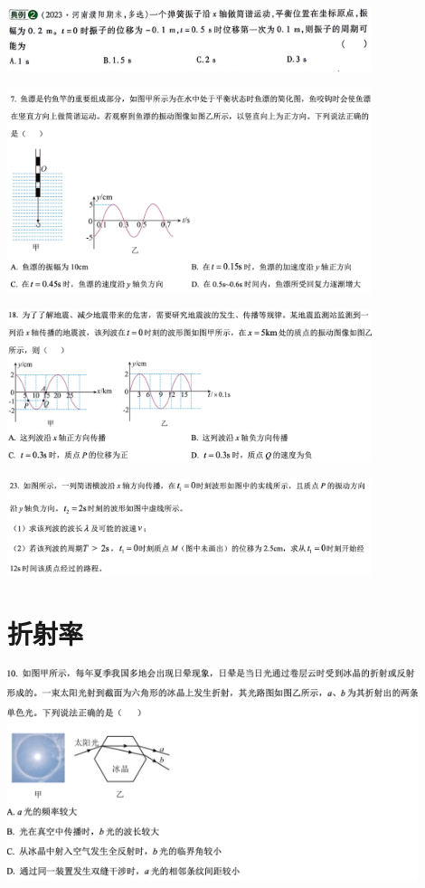 \documentclass{article}
\begin{document}
\includegraphics[width = 0.8\textwidth]{./pictures/17.png}

\vspace{5em}

\includegraphics[width = 0.8\textwidth]{./pictures/18.png}

\vspace{5em}

\includegraphics[width = 0.8\textwidth]{./pictures/19.png}

\vspace{5em}

\includegraphics[width = 0.8\textwidth]{./pictures/20.png}

\vspace{5em}

\section{折射率}
\includegraphics[width = 0.9\textwidth]{./pictures/24.png}
\end{document}
